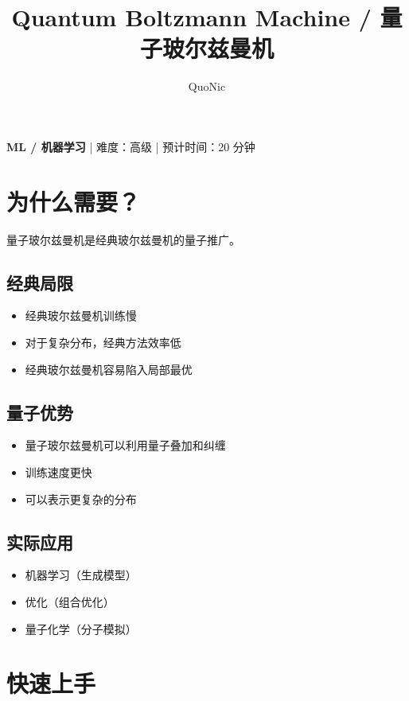 \documentclass[12pt,a4paper]{article}
\title{Quantum Boltzmann Machine / 量子玻尔兹曼机}
\author{QuoNic}
\date{}
\begin{document}
\maketitle

\begin{center}
\textbf{ML / 机器学习} | 难度：高级 | 预计时间：20 分钟
\end{center}

\tableofcontents
\newpage

\section{为什么需要？}

量子玻尔兹曼机是经典玻尔兹曼机的量子推广。

\subsection{经典局限}
\begin{itemize}
  \item 经典玻尔兹曼机训练慢
  \item 对于复杂分布，经典方法效率低
  \item 经典玻尔兹曼机容易陷入局部最优
\end{itemize}

\subsection{量子优势}
\begin{itemize}
  \item 量子玻尔兹曼机可以利用量子叠加和纠缠
  \item 训练速度更快
  \item 可以表示更复杂的分布
\end{itemize}

\subsection{实际应用}
\begin{itemize}
  \item 机器学习（生成模型）
  \item 优化（组合优化）
  \item 量子化学（分子模拟）
\end{itemize}

\section{快速上手}
\end{document}
